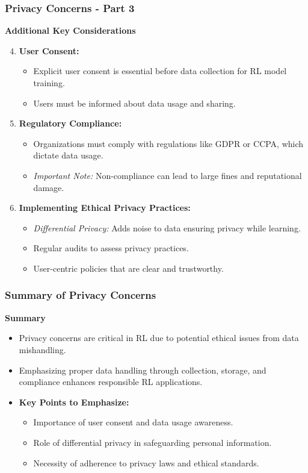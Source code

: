 \documentclass[aspectratio=169]{beamer}
\begin{document}
\begin{frame}[fragile]
    \frametitle{Privacy Concerns - Part 3}
    \textbf{Additional Key Considerations}
    \begin{enumerate}
        \setcounter{enumi}{3}
        \item \textbf{User Consent:}
            \begin{itemize}
                \item Explicit user consent is essential before data collection for RL model training.
                \item Users must be informed about data usage and sharing.
            \end{itemize}
        
        \item \textbf{Regulatory Compliance:}
            \begin{itemize}
                \item Organizations must comply with regulations like GDPR or CCPA, which dictate data usage.
                \item \textit{Important Note:} Non-compliance can lead to large fines and reputational damage.
            \end{itemize}
        
        \item \textbf{Implementing Ethical Privacy Practices:}
            \begin{itemize}
                \item \textit{Differential Privacy:} Adds noise to data ensuring privacy while learning.
                \item Regular audits to assess privacy practices.
                \item User-centric policies that are clear and trustworthy.
            \end{itemize}
    \end{enumerate}
\end{frame}

\begin{frame}[fragile]
    \frametitle{Summary of Privacy Concerns}
    \textbf{Summary}
    \begin{itemize}
        \item Privacy concerns are critical in RL due to potential ethical issues from data mishandling.
        \item Emphasizing proper data handling through collection, storage, and compliance enhances responsible RL applications.
        \item \textbf{Key Points to Emphasize:}
            \begin{itemize}
                \item Importance of user consent and data usage awareness.
                \item Role of differential privacy in safeguarding personal information.
                \item Necessity of adherence to privacy laws and ethical standards.
            \end{itemize}
    \end{itemize}
\end{frame}
\end{document}
